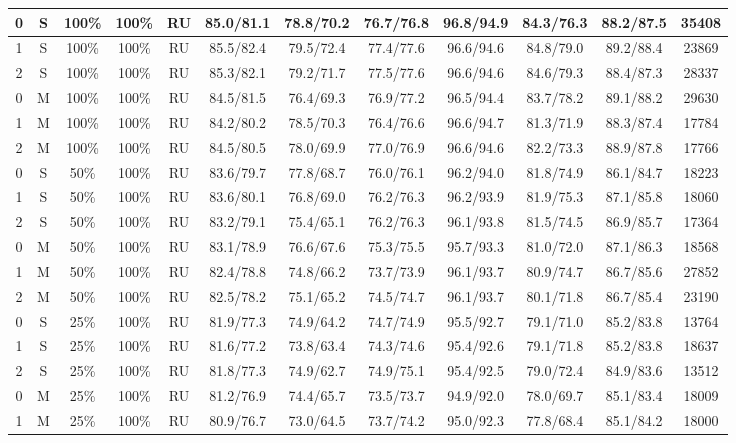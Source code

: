 \begin{table*}
{\begin{tabular}{|c|c|c|c|c||c|c|c|c|c|c||c|}
0 & S & 100\% & 100\% & RU & 85.0/81.1 & 78.8/70.2 & 76.7/76.8 & 96.8/94.9 & 84.3/76.3 & 88.2/87.5 & 35408 \\ \hline
1 & S & 100\% & 100\% & RU & 85.5/82.4 & 79.5/72.4 & 77.4/77.6 & 96.6/94.6 & 84.8/79.0 & 89.2/88.4 & 23869 \\ \hline
2 & S & 100\% & 100\% & RU & 85.3/82.1 & 79.2/71.7 & 77.5/77.6 & 96.6/94.6 & 84.6/79.3 & 88.4/87.3 & 28337 \\ \hline
0 & M & 100\% & 100\% & RU & 84.5/81.5 & 76.4/69.3 & 76.9/77.2 & 96.5/94.4 & 83.7/78.2 & 89.1/88.2 & 29630 \\ \hline
1 & M & 100\% & 100\% & RU & 84.2/80.2 & 78.5/70.3 & 76.4/76.6 & 96.6/94.7 & 81.3/71.9 & 88.3/87.4 & 17784 \\ \hline
2 & M & 100\% & 100\% & RU & 84.5/80.5 & 78.0/69.9 & 77.0/76.9 & 96.6/94.6 & 82.2/73.3 & 88.9/87.8 & 17766 \\ \hline
0 & S & 50\% & 100\% & RU & 83.6/79.7 & 77.8/68.7 & 76.0/76.1 & 96.2/94.0 & 81.8/74.9 & 86.1/84.7 & 18223 \\ \hline
1 & S & 50\% & 100\% & RU & 83.6/80.1 & 76.8/69.0 & 76.2/76.3 & 96.2/93.9 & 81.9/75.3 & 87.1/85.8 & 18060 \\ \hline
2 & S & 50\% & 100\% & RU & 83.2/79.1 & 75.4/65.1 & 76.2/76.3 & 96.1/93.8 & 81.5/74.5 & 86.9/85.7 & 17364 \\ \hline
0 & M & 50\% & 100\% & RU & 83.1/78.9 & 76.6/67.6 & 75.3/75.5 & 95.7/93.3 & 81.0/72.0 & 87.1/86.3 & 18568 \\ \hline
1 & M & 50\% & 100\% & RU & 82.4/78.8 & 74.8/66.2 & 73.7/73.9 & 96.1/93.7 & 80.9/74.7 & 86.7/85.6 & 27852 \\ \hline
2 & M & 50\% & 100\% & RU & 82.5/78.2 & 75.1/65.2 & 74.5/74.7 & 96.1/93.7 & 80.1/71.8 & 86.7/85.4 & 23190 \\ \hline
0 & S & 25\% & 100\% & RU & 81.9/77.3 & 74.9/64.2 & 74.7/74.9 & 95.5/92.7 & 79.1/71.0 & 85.2/83.8 & 13764 \\ \hline
1 & S & 25\% & 100\% & RU & 81.6/77.2 & 73.8/63.4 & 74.3/74.6 & 95.4/92.6 & 79.1/71.8 & 85.2/83.8 & 18637 \\ \hline
2 & S & 25\% & 100\% & RU & 81.8/77.3 & 74.9/62.7 & 74.9/75.1 & 95.4/92.5 & 79.0/72.4 & 84.9/83.6 & 13512 \\ \hline
0 & M & 25\% & 100\% & RU & 81.2/76.9 & 74.4/65.7 & 73.5/73.7 & 94.9/92.0 & 78.0/69.7 & 85.1/83.4 & 18009 \\ \hline
1 & M & 25\% & 100\% & RU & 80.9/76.7 & 73.0/64.5 & 73.7/74.2 & 95.0/92.3 & 77.8/68.4 & 85.1/84.2 & 18000 \\ \hline

\end{tabular}}
\end{table*}

